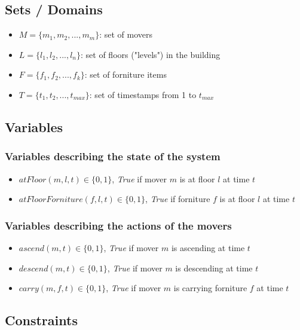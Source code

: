 \documentclass[a4paper, 11pt]{article}
\begin{document}
\subsection{Sets / Domains}

\begin{itemize}
    \item $M = \{m_1, m_2, ..., m_m\}$: set of movers
    \item $L = \{l_1, l_2, ..., l_n\}$: set of floors ("levels") in the building
    \item $F = \{f_1, f_2, ..., f_k\}$: set of forniture items
    \item $T = \{t_1, t_2, ..., t_{max}\}$: set of timestamps from 1 to $t_{max}$
\end{itemize}


\subsection{Variables}

\subsubsection{Variables describing the state of the system}

\begin{itemize}
    \item $atFloor(m, l, t) \in \{0, 1\}$, \textit{True} if mover $m$ is at floor $l$ at time $t$
    \item $atFloorForniture(f, l, t) \in \{0, 1\}$, \textit{True} if forniture $f$ is at floor $l$ at time $t$
\end{itemize}

\subsubsection{Variables describing the actions of the movers}

\begin{itemize}
    \item $ascend(m, t) \in \{0, 1\}$, \textit{True} if mover $m$ is ascending at time $t$
    \item $descend(m, t) \in \{0, 1\}$, \textit{True} if mover $m$ is descending at time $t$
    \item $carry(m, f,  t) \in \{0, 1\}$, \textit{True} if mover $m$ is carrying forniture $f$ at time $t$
\end{itemize}

\subsection{Constraints}
\end{document}

